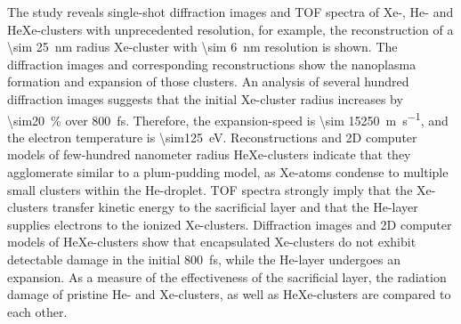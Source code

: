 The study reveals single-shot diffraction images and TOF spectra of Xe-, He- and HeXe-clusters with unprecedented resolution, for example, the reconstruction of a \SI{\sim 25}{\nano\meter} radius Xe-cluster with \SI{\sim 6}{\nano\meter} resolution is shown. The diffraction images and corresponding reconstructions show the nanoplasma formation and expansion of those clusters. An analysis of several hundred diffraction images suggests that the initial Xe-cluster radius increases by \SI{\sim20}{\percent} over \SI{800}{\femto\second}. Therefore, the expansion-speed is \SI{\sim 15250}{\meter\per\second}, and the electron temperature is \SI{\sim125}{\electronvolt}. Reconstructions and 2D computer models of few-hundred nanometer radius HeXe-clusters indicate that they agglomerate similar to a plum-pudding model, as Xe-atoms condense to multiple small clusters within the He-droplet. TOF spectra strongly imply that the Xe-clusters transfer kinetic energy to the sacrificial layer and that the He-layer supplies electrons to the ionized Xe-clusters. Diffraction images and 2D computer models of HeXe-clusters show that encapsulated Xe-clusters do not exhibit detectable damage in the initial \SI{800}{\femto\second}, while the He-layer undergoes an expansion. As a measure of the effectiveness of the sacrificial layer, the radiation damage of pristine He- and Xe-clusters, as well as HeXe-clusters are compared to each other.
%
%
%
%